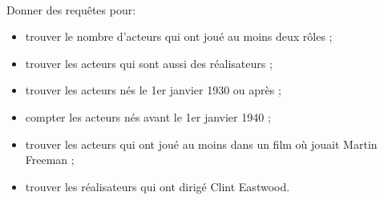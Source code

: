 \exer{[SQL-004]}
\setcounter{numques}{0}~\\

Donner des requêtes pour:

\begin{itemize}
\item trouver le nombre d'acteurs qui ont joué au moins deux rôles ;
\item trouver les acteurs qui sont aussi des réalisateurs ;
\item trouver les acteurs nés le 1er janvier 1930 ou après ;
\item compter les acteurs nés avant le 1er janvier 1940 ;
\item trouver les acteurs qui ont joué au moins dans un film où jouait
  Martin Freeman ;
\item trouver les réalisateurs qui ont dirigé Clint Eastwood.
\end{itemize}